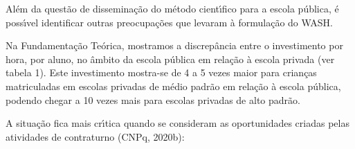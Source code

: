 \documentclass[
12pt,		%
openright,	%
twoside,  %
a4paper,			%
chapter=TITLE,		%
english,			%
french,				%
spanish,			%
brazil				%
]{USPSC-classe/USPSC}
\begin{document}
Al\'em da quest\~ao de dissemina\c{c}\~ao do m\'etodo cient\'{\i}fico para a escola p\'ublica, \'e poss\'{\i}vel identificar outras preocupa\c{c}\~oes que levaram \`a formula\c{c}\~ao do WASH.

















Na Fundamenta\c{c}\~ao Te\'orica, mostramos a discrep\^ancia entre o investimento por hora, por aluno, no \^ambito da escola p\'ublica em rela\c{c}\~ao \`a escola privada (ver tabela 1). Este investimento mostra-se de 4 a 5 vezes maior para crian\c{c}as matriculadas em escolas privadas de m\'edio padr\~ao em rela\c{c}\~ao \`a escola p\'ublica, podendo chegar a 10 vezes mais para escolas privadas de alto padr\~ao.

















A situa\c{c}\~ao fica mais cr\'{\i}tica quando se consideram as oportunidades criadas pelas atividades de contraturno (CNPq, 2020b):


















\noindent\begin{center}\mbox{\centering{}}\end{center}
\end{document}
